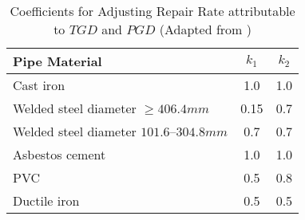 \begin{table}[H]
	\centering
	\caption{Coefficients for Adjusting Repair Rate attributable to $TGD$ and $PGD$ (Adapted from \protect \cite{american_lifelines_alliance_ala_seismic_2001})}
	\label{table:k1&k2}
	\small
	\begin{tabular}{lcc}
		\hline
		Pipe Material & $k_1$ & $k_2$\\ \hline
		Cast iron & 1.0 & 1.0 \\
		Welded steel diameter $\geq 406.4mm$ & 0.15 & 0.7 \\
		Welded steel diameter $101.6–304.8 mm$ & 0.7 & 0.7 \\
		Asbestos cement & 1.0 & 1.0 \\
		PVC & 0.5 & 0.8 \\
		Ductile iron & 0.5 & 0.5 \\
		\hline
	\end{tabular}
\end{table}